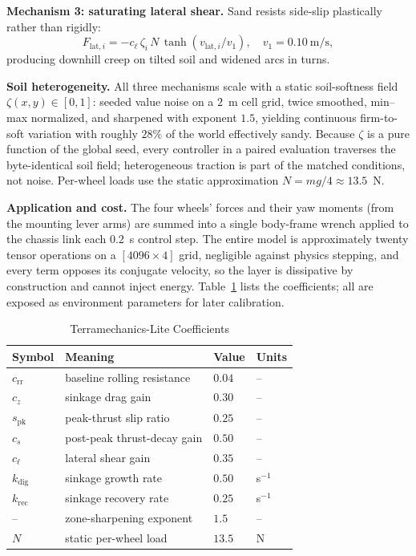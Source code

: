 \documentclass[conference]{IEEEtran}
\begin{document}
\vspace{1mm}
\noindent\textbf{Mechanism 3: saturating lateral shear.} Sand resists side-slip plastically rather than rigidly:
\begin{equation}
F_{\text{lat},i} = -c_{\ell}\, \zeta_i\, N\, \tanh(v_{\text{lat},i}/v_1), \quad v_1 = 0.10~\text{m/s},
\end{equation}
producing downhill creep on tilted soil and widened arcs in turns.

\vspace{1mm}
\noindent\textbf{Soil heterogeneity.} All three mechanisms scale with a static soil-softness field $\zeta(x,y) \in [0,1]$: seeded value noise on a $2$~m cell grid, twice smoothed, min--max normalized, and sharpened with exponent $1.5$, yielding continuous firm-to-soft variation with roughly $28\%$ of the world effectively sandy. Because $\zeta$ is a pure function of the global seed, every controller in a paired evaluation traverses the byte-identical soil field; heterogeneous traction is part of the matched conditions, not noise. Per-wheel loads use the static approximation $N = m g / 4 \approx 13.5$~N.

\vspace{1mm}
\noindent\textbf{Application and cost.} The four wheels' forces and their yaw moments (from the mounting lever arms) are summed into a single body-frame wrench applied to the chassis link each $0.2$~s control step. The entire model is approximately twenty tensor operations on a $[4096 \times 4]$ grid, negligible against physics stepping, and every term opposes its conjugate velocity, so the layer is dissipative by construction and cannot inject energy. Table~\ref{tab:soil_coeffs} lists the coefficients; all are exposed as environment parameters for later calibration.

\begin{table}[t]
\centering
\caption{Terramechanics-Lite Coefficients}
\label{tab:soil_coeffs}
{\footnotesize
\setlength{\tabcolsep}{4pt}
\begin{tabular}{@{}llll@{}}
\toprule
\textbf{Symbol} & \textbf{Meaning} & \textbf{Value} & \textbf{Units} \\
\midrule
$c_{\text{rr}}$ & baseline rolling resistance & $0.04$ & -- \\
$c_{z}$ & sinkage drag gain & $0.30$ & -- \\
$s_{\text{pk}}$ & peak-thrust slip ratio & $0.25$ & -- \\
$c_{s}$ & post-peak thrust-decay gain & $0.50$ & -- \\
$c_{\ell}$ & lateral shear gain & $0.35$ & -- \\
$k_{\text{dig}}$ & sinkage growth rate & $0.50$ & s$^{-1}$ \\
$k_{\text{rec}}$ & sinkage recovery rate & $0.25$ & s$^{-1}$ \\
-- & zone-sharpening exponent & $1.5$ & -- \\
$N$ & static per-wheel load & $13.5$ & N \\
\bottomrule
\end{tabular}
}
\end{table}
\end{document}
